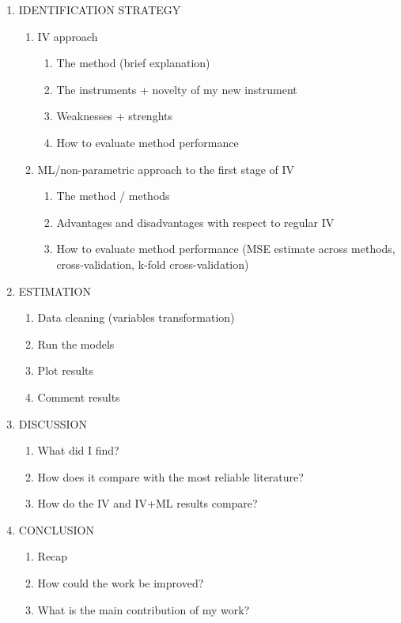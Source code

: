 \documentclass{article}
\begin{document}
\begin{enumerate}
    \item IDENTIFICATION STRATEGY
    \begin{enumerate}
        \item IV approach
        \begin{enumerate}
            \item The method (brief explanation)
            \item The instruments + novelty of my new instrument
            \item Weaknesses + strenghts
            \item How to evaluate method performance
        \end{enumerate}
        \item ML/non-parametric approach to the first stage of IV
        \begin{enumerate}
            \item The method / methods
            \item Advantages and disadvantages with respect to regular IV
            \item How to evaluate method performance (MSE estimate across methods, cross-validation, k-fold cross-validation)
        \end{enumerate} 
    \end{enumerate}

    \item ESTIMATION
    \begin{enumerate}
        \item Data cleaning (variables transformation)
        \item Run the models
        \item Plot results
        \item Comment results
    \end{enumerate}

    \item DISCUSSION
    \begin{enumerate}
        \item What did I find?
        \item How does it compare with the most reliable literature?
        \item How do the IV and IV+ML results compare?
    \end{enumerate}

    \item CONCLUSION
    \begin{enumerate}
        \item Recap
        \item How could the work be improved?
        \item What is the main contribution of my work?
    \end{enumerate}

\end{enumerate}
\end{document}
